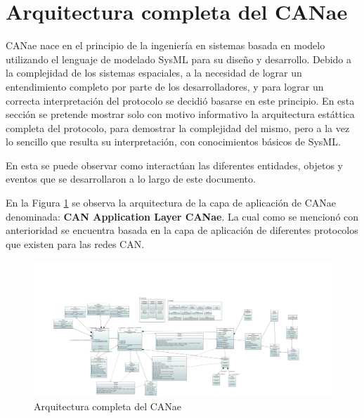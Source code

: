 \section{Arquitectura completa del CANae}
CANae nace en el principio de la ingeniería en sistemas basada en modelo
utilizando el lenguaje de modelado SysML para su diseño y desarrollo.
Debido a la complejidad de los sistemas espaciales, a la
necesidad de lograr un entendimiento completo por parte de los desarrolladores,
y para lograr un correcta interpretación del protocolo se decidió basarse en
este principio. En esta sección se pretende mostrar solo con motivo informativo
la arquitectura estáttica completa del protocolo, para demostrar la complejidad
del mismo, pero a la vez lo sencillo que resulta su interpretación, con
conocimientos básicos de SysML.

En esta se puede observar como interactúan las diferentes entidades, objetos y
eventos que se desarrollaron a lo largo de este documento.

En la Figura \ref{fig:Arq_CAN_App_Layer} se observa la arquitectura de la capa
de aplicación de CANae denominada: \textbf{CAN Application Layer CANae}. La cual
como se mencionó con anterioridad se encuentra basada en la capa de aplicación
de diferentes protocolos que existen para las redes CAN.

\begin{figure}
    \centering
    \includegraphics[scale=0.15]{images/Secciones/AppendixA/Complete_CANAppLayerCANae.JPG}
    \caption{Arquitectura completa del CANae}
    \label{fig:Arq_CAN_App_Layer}
\end{figure}
